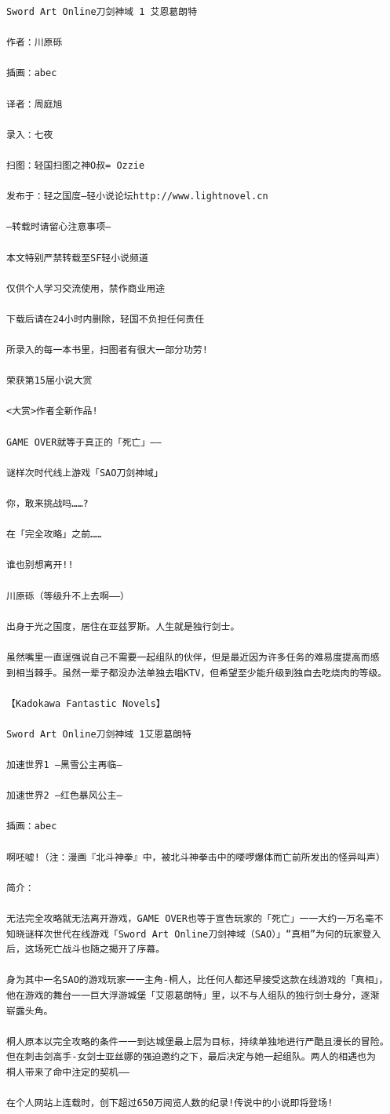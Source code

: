 \documentclass[11pt]{book}
\begin{document}
\begin{verbatim}
Sword Art Online刀剑神域 1 艾恩葛朗特

作者：川原砾

插画：abec

译者：周庭旭

录入：七夜

扫图：轻国扫图之神O叔= Ozzie

发布于：轻之国度—轻小说论坛http://www.lightnovel.cn

—转载时请留心注意事项—

本文特别严禁转载至SF轻小说频道

仅供个人学习交流使用，禁作商业用途

下载后请在24小时内删除，轻国不负担任何责任

所录入的每一本书里，扫图者有很大一部分功劳!

荣获第15届小说大赏

<大赏>作者全新作品!

GAME OVER就等于真正的「死亡」——

谜样次时代线上游戏「SAO刀剑神域」

你，敢来挑战吗……?

在「完全攻略」之前……

谁也别想离开!!

川原砾（等级升不上去啊——）

出身于光之国度，居住在亚兹罗斯。人生就是独行剑士。

虽然嘴里一直逞强说自己不需要一起组队的伙伴，但是最近因为许多任务的难易度提高而感
到相当棘手。虽然一辈子都没办法单独去唱KTV，但希望至少能升级到独自去吃烧肉的等级。

【Kadokawa Fantastic Novels】

Sword Art Online刀剑神域 1艾恩葛朗特

加速世界1 —黑雪公主再临—

加速世界2 —红色暴风公主—

插画：abec

啊呸嘘!（注：漫画『北斗神拳』中，被北斗神拳击中的喽啰爆体而亡前所发出的怪异叫声）

简介：

无法完全攻略就无法离开游戏，GAME OVER也等于宣告玩家的「死亡」一一大约一万名毫不
知晓谜样次世代在线游戏「Sword Art Online刀剑神域（SAO）」“真相”为何的玩家登入
后，这场死亡战斗也随之揭开了序幕。

身为其中一名SAO的游戏玩家一一主角-桐人，比任何人都还早接受这款在线游戏的「真相」，
他在游戏的舞台一一巨大浮游城堡「艾恩葛朗特」里，以不与人组队的独行剑士身分，逐渐
崭露头角。

桐人原本以完全攻略的条件一一到达城堡最上层为目标，持续单独地进行严酷且漫长的冒险。
但在刺击剑高手-女剑士亚丝娜的强迫邀约之下，最后决定与她一起组队。两人的相遇也为
桐人带来了命中注定的契机——

在个人网站上连载时，创下超过650万阅览人数的纪录!传说中的小说即将登场!
\end{verbatim}
\end{document}
